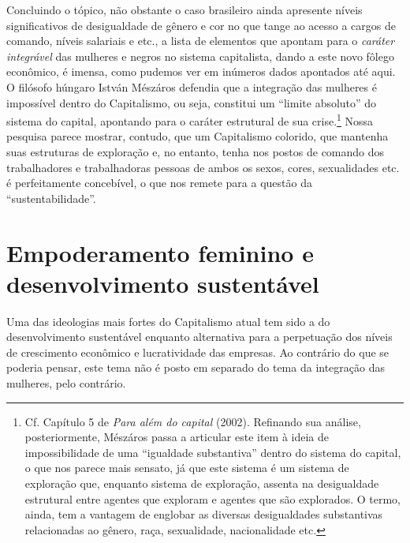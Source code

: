 Concluindo o tópico, não obstante o caso brasileiro ainda apresente
níveis significativos de desigualdade de gênero e cor no que tange ao
acesso a cargos de comando, níveis salariais e etc., a lista de
elementos que apontam para o \emph{caráter integrável} das mulheres e
negros no sistema capitalista, dando a este novo fôlego econômico, é
imensa, como pudemos ver em inúmeros dados apontados até aqui. O
filósofo húngaro István Mészáros defendia que a integração das mulheres
é impossível dentro do Capitalismo, ou seja, constitui um ``limite
absoluto'' do sistema do capital, apontando para o caráter estrutural de
sua crise.\footnote{Cf. Capítulo 5 de \emph{Para além do capital}
  (2002). Refinando sua análise, posteriormente, Mészáros passa a
  articular este item à ideia de impossibilidade de uma ``igualdade
  substantiva'' dentro do sistema do capital, o que nos parece mais
  sensato, já que este sistema é um sistema de exploração que, enquanto
  sistema de exploração, assenta na desigualdade estrutural entre
  agentes que exploram e agentes que são explorados. O termo, ainda, tem
  a vantagem de englobar as diversas desigualdades substantivas
  relacionadas ao gênero, raça, sexualidade, nacionalidade etc.} Nossa
pesquisa parece mostrar, contudo, que um Capitalismo colorido, que
mantenha suas estruturas de exploração e, no entanto, tenha nos postos
de comando dos trabalhadores e trabalhadoras pessoas de ambos os sexos,
cores, sexualidades etc. é perfeitamente concebível, o que nos remete
para a questão da ``sustentabilidade''.

\chapter{Empoderamento feminino e desenvolvimento sustentável}

Uma das ideologias mais fortes do Capitalismo atual tem sido a do
desenvolvimento sustentável enquanto alternativa para a perpetuação dos
níveis de crescimento econômico e lucratividade das empresas. Ao
contrário do que se poderia pensar, este tema não é posto em separado do
tema da integração das mulheres, pelo contrário.

